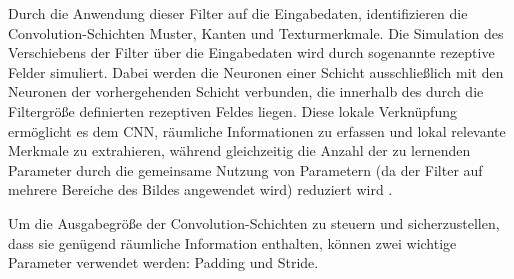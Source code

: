Durch die Anwendung dieser Filter auf die Eingabedaten, identifizieren die\\Convolution-Schichten Muster, Kanten und Texturmerkmale. Die Simulation des Verschiebens der Filter über die Eingabedaten wird durch sogenannte rezeptive Felder simuliert. Dabei werden die Neuronen einer Schicht ausschließlich mit den Neuronen der vorhergehenden Schicht verbunden, die innerhalb des durch die Filtergröße definierten rezeptiven Feldes liegen. Diese lokale Verknüpfung ermöglicht es dem CNN, räumliche Informationen zu erfassen und lokal relevante Merkmale zu extrahieren, während gleichzeitig die Anzahl der zu lernenden Parameter durch die gemeinsame Nutzung von Parametern (da der Filter auf mehrere Bereiche des Bildes angewendet wird) reduziert wird \cite{weisstein_convolution}.

Um die Ausgabegröße der Convolution-Schichten zu steuern und sicherzustellen, dass sie genügend räumliche Information enthalten, können zwei wichtige Parameter verwendet werden: Padding und Stride.

